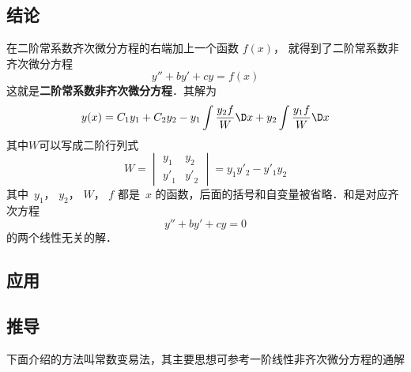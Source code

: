 

\subsection{结论}

在二阶常系数齐次微分方程的右端加上一个函数 $f(x)$， 就得到了二阶常系数非齐次微分方程
\begin{equation}\label{Ode2N_eq1}
y'' + by' + cy = f(x)
\end{equation}
这就是\textbf{二阶常系数非齐次微分方程}．其解为
\begin{equation} y(x) = {C_1}{y_1} + {C_2}{y_2} - {y_1}\int {\frac{{y_2}f}{W}\D x + {y_2}\int {\frac{{y_1}f}{W}\D x} } \end{equation}
其中$W$可以写成二阶行列式
\begin{equation}
W = 
\begin{vmatrix}
{{y_1}}&{{y_2}}\\
{{{y'}_1}}&{{{y'}_2}}
\end{vmatrix} = {y_1}{y'_2} - {y'_1}{y_2}
\end{equation}
其中\ $y_1$，  $y_2$，  $W$，  $f$ 都是\ $x$ 的函数，后面的括号和自变量被省略．和是对应齐次方程 
\begin{equation}\label{Ode2N_eq4}
y'' + by' + cy = 0
\end{equation}
的两个线性无关的解．

\subsection{应用} %

\subsection{推导}

下面介绍的方法叫常数变易法，其主要思想可参考一阶线性非齐次微分方程的通解%

